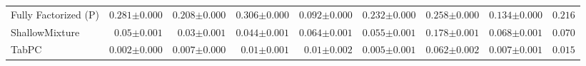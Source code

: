 \begin{tabular}{lrrrrrrr|r}
    Fully Factorized (P) & $0.281${\tiny${\pm 0.000}$} & $0.208${\tiny${\pm 0.000}$} & $0.306${\tiny${\pm 0.000}$} & $0.092${\tiny${\pm 0.000}$} & $0.232${\tiny${\pm 0.000}$} & $0.258${\tiny${\pm 0.000}$} & $0.134${\tiny${\pm 0.000}$} & $0.216$ \\
    ShallowMixture & $0.05${\tiny${\pm 0.001}$} & $0.03${\tiny${\pm 0.001}$} & $0.044${\tiny${\pm 0.001}$} & $0.064${\tiny${\pm 0.001}$} & $0.055${\tiny${\pm 0.001}$} & $0.178${\tiny${\pm 0.001}$} & $0.068${\tiny${\pm 0.001}$} & $0.070$ \\
    TabPC & $0.002${\tiny${\pm 0.000}$} & $0.007${\tiny${\pm 0.000}$} & $0.01${\tiny${\pm 0.001}$} & $0.01${\tiny${\pm 0.002}$} & $0.005${\tiny${\pm 0.001}$} & $0.062${\tiny${\pm 0.002}$} & $0.007${\tiny${\pm 0.001}$} & $0.015$ \\
    \bottomrule[1.0pt]
\end{tabular}